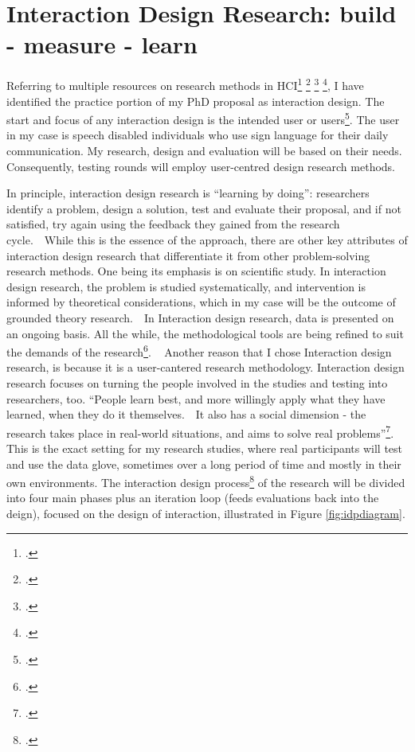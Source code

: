 \section{Interaction Design Research: build - measure - learn}

Referring to multiple resources on research methods in HCI\footcite{Cox2008} \footcite{Dix2004} \footcite{Lazar2010} \footcite{Zimmerman:2007:RTD:1240624.1240704}, I have identified the practice portion of my PhD proposal as interaction design. The start and focus of any interaction design is the intended user or users\footcite{Dix2004}. The user in my case is speech disabled individuals who use sign language for their daily communication. My research, design and evaluation will be based on their needs. Consequently, testing rounds will employ user-centred design research methods.

In principle, interaction design research is ``learning by doing'': researchers identify a problem, design a solution, test and evaluate their proposal, and if not satisfied, try again using the feedback they gained from the research cycle.  While this is the essence of the approach, there are other key attributes of interaction design research that differentiate it from other problem-solving research methods. One being its emphasis is on scientific study. In interaction design research, the problem is studied systematically, and intervention is informed by theoretical considerations, which in my case will be the outcome of grounded theory research.  In Interaction design research, data is presented on an ongoing basis. All the while, the methodological tools are being refined to suit the demands of the research\footcite{OBrienRoryFacultyofInformationStudies2001}. 
 
Another reason that I chose Interaction design research, is because it is a user-cantered research methodology. Interaction design research focuses on turning the people involved in the studies and testing into researchers, too. ``People learn best, and more willingly apply what they have learned, when they do it themselves.  It also has a social dimension - the research takes place in real-world situations, and aims to solve real problems''\footcite{OBrienRoryFacultyofInformationStudies2001}. This is the exact setting for my research studies, where real participants will test and use the data glove, sometimes over a long period of time and mostly in their own environments.
The interaction design process\footcite{Dix2004} of the research will be divided into four main phases plus an iteration loop (feeds evaluations back into the deign), focused on the design of interaction, illustrated in Figure \ref{fig:idpdiagram}.

